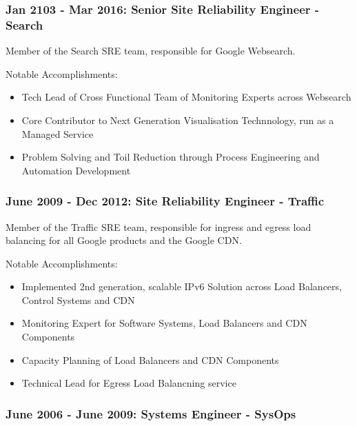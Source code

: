 \documentclass[a4paper, 10pt] {article}
\begin{document}
\subsubsection*{Jan 2103 - Mar 2016: Senior Site Reliability Engineer - Search}

Member of the Search SRE team, responsible for Google Websearch.

\vspace{5mm} %

Notable Accomplishments:

\begin{itemize}
  \item Tech Lead of Cross Functional Team of Monitoring Experts across Websearch
  \item Core Contributor to Next Generation Visualisation Technnology, run as a Managed Service
  \item Problem Solving and Toil Reduction through Process Engineering and Automation Development
\end{itemize}

\subsubsection*{June 2009 - Dec 2012: Site Reliability Engineer - Traffic}

Member of the Traffic SRE team, responsible for ingress and egress load balancing for all Google products and the Google CDN. 

\vspace{5mm} %

Notable Accomplishments:

\begin{itemize}
  \item Implemented 2nd generation, scalable IPv6 Solution across Load Balancers, Control Systems and CDN
  \item Monitoring Expert for Software Systems, Load Balancers and CDN Components 
  \item Capacity Planning of Load Balancers and CDN Components
  \item Technical Lead for Egress Load Balancning service
\end{itemize}

\subsubsection*{June 2006 - June 2009: Systems Engineer - SysOps}
\end{document}
